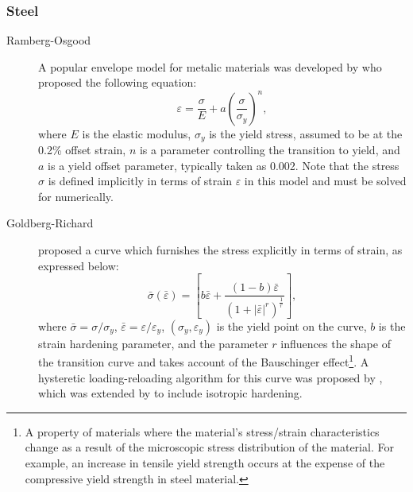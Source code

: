 \subsubsection{Steel}\label{sec:steel}
\begin{description}
    \item[Ramberg-Osgood] A popular envelope model for metalic materials was developed by \citep{ramberg1943description} who proposed the following equation:
    \begin{equation}
    \varepsilon=\frac{\sigma}{E}+a\left(\frac{\sigma}{\sigma_y}\right)^n,
    \label{eq:RO}
    \end{equation}
    where $E$ is the elastic modulus, $\sigma_y$ is the yield stress, assumed to be at the 0.2\% offset strain, $n$ is a parameter controlling the transition to yield, and $a$ is a yield offset parameter, typically taken as 0.002. Note that the stress \(\sigma\) is defined implicitly in terms of strain \(\varepsilon\) in this model and must be solved for numerically.
    \item[Goldberg-Richard] \cite{goldberg1963analysis} proposed a curve which furnishes the stress explicitly in terms of strain, as expressed below:
    \begin{equation}
    \bar{\sigma}(\bar{\varepsilon}) = \left[b{\bar{\varepsilon}} + \frac{(1-b){\bar{\varepsilon}}}{\left(1 + |{\bar{\varepsilon}}|^r\right)^\frac{1}{r}}\right],
    \label{eq:goldberg-richard}
    \end{equation}
    where $\bar{\sigma}=\sigma/\sigma_y$, $\bar{\varepsilon}=\varepsilon/\varepsilon_y$, $(\sigma_y, \varepsilon_y)$ is the yield point on the curve, $b$ is the strain hardening parameter, and the parameter $r$ influences the shape of the transition curve and takes account of the Bauschinger effect{\footnote{A property of materials where the material's stress/strain characteristics change as a result of the microscopic stress distribution of the material. For example, an increase in tensile yield strength occurs at the expense of the compressive yield strength in steel material.}}. A hysteretic loading-reloading algorithm for this curve was proposed by \cite{giuffre1970comportamento}, which was extended by \cite{filippou1983effects} to include isotropic hardening.
\end{description}

